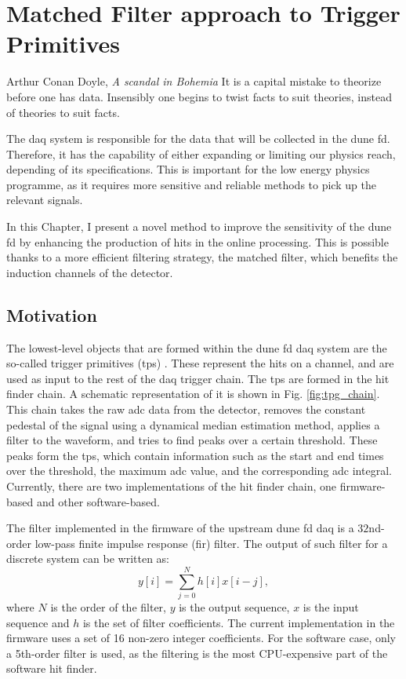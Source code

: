 \chapter{Matched Filter approach to Trigger Primitives}\label{chapter:matched_filter}

\begin{chapquote}{Arthur Conan Doyle, \textit{A scandal in Bohemia}}
	It is a capital mistake to theorize before one has data. Insensibly one begins to twist facts to suit theories, instead of theories to suit facts.
\end{chapquote}

The \gls{daq} system is responsible for the data that will be collected in the \gls{dune} \gls{fd}. Therefore, it has the capability of either expanding or limiting our physics reach, depending of its specifications. This is important for the low energy physics programme, as it requires more sensitive and reliable methods to pick up the relevant signals.

In this Chapter, I present a novel method to improve the sensitivity of the \gls{dune} \gls{fd} by enhancing the production of hits in the online processing. This is possible thanks to a more efficient filtering strategy, the matched filter, which benefits the induction channels of the detector.

\section{Motivation}
\label{sec:matched_filter_motivation}

The lowest-level objects that are formed within the \gls{dune} \gls{fd} \gls{daq} system are the so-called trigger primitives (\gls{tp}s) \cite{DUNEDAQ2022}. These represent the hits on a channel, and are used as input to the rest of the \gls{daq} trigger chain. The \gls{tp}s are formed in the hit finder chain. A schematic representation of it is shown in Fig. \ref{fig:tpg_chain}. This chain takes the raw \gls{adc} data from the detector, removes the constant pedestal of the signal using a dynamical median estimation method, applies a filter to the waveform, and tries to find peaks over a certain threshold. These peaks form the \gls{tp}s, which contain information such as the start and end times over the threshold, the maximum \gls{adc} value, and the corresponding \gls{adc} integral. Currently, there are two implementations of the hit finder chain, one firmware-based and other software-based.

The filter implemented in the firmware of the upstream \gls{dune} \gls{fd} \gls{daq} is a $32$nd-order low-pass finite impulse response (\gls{fir}) filter. The output of such filter for a discrete system can be written as:
\begin{equation}\label{2.1.1}
	y[i] = \sum_{j=0}^{N} h[i] x[i-j],
\end{equation}
where $N$ is the order of the filter, $y$ is the output sequence, $x$ is the input sequence and $h$ is the set of filter coefficients. The current implementation in the firmware uses a set of 16 non-zero integer coefficients. For the software case, only a 5th-order filter is used, as the filtering is the most CPU-expensive part of the software hit finder.

